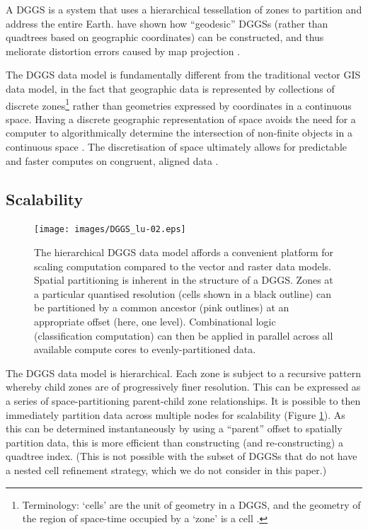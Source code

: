 \documentclass[]{interact}
\theoremstyle{plain}%
\theoremstyle{definition}
\theoremstyle{remark}
\begin{document}
A \ac{DGGS} is a system that uses a hierarchical tessellation of zones to partition and address the entire Earth. \citet{sahr2003geodesic} have shown how ``geodesic'' \acp{DGGS} (rather than quadtrees based on geographic coordinates) can be constructed, and thus meliorate distortion errors caused by map projection \citep{goodchild2018reimagining}.

The \ac{DGGS} data model is fundamentally different from the traditional vector \ac{GIS} data model, in the fact that geographic data is represented by collections of discrete zones\footnote{Terminology: `cells' are the unit of geometry in a \ac{DGGS}, and the geometry of the region of space-time occupied by a `zone' is a cell \citep{topic21}.} rather than geometries expressed by coordinates in a continuous space. Having a discrete geographic representation of space avoids the need for a computer to algorithmically determine the intersection of non-finite objects in a continuous space \citep{bentley1979algorithms,robertson2020integrated}. The discretisation of space ultimately allows for predictable and faster computes on congruent, aligned data \citep{dutton1989modelling}.

\subsection{Scalability}

\begin{figure}[t]
    \centering
    \texttt{[image: images/DGGS\_lu-02.eps]}
    \caption{The hierarchical \ac{DGGS} data model affords a convenient platform for scaling computation compared to the vector and raster data models. Spatial partitioning is inherent in the structure of a \ac{DGGS}. Zones at a particular quantised resolution (cells shown in a black outline) can be partitioned by a common ancestor (pink outlines) at an appropriate offset (here, one level). Combinational logic (classification computation) can then be applied in parallel across all available compute cores to evenly-partitioned data.}
    \label{fig:Scalable}
\end{figure}

The \ac{DGGS} data model is hierarchical. Each zone is subject to a recursive pattern whereby child zones are of progressively finer resolution. This can be expressed as a series of space-partitioning parent-child zone relationships. It is possible to then immediately partition data across multiple nodes for scalability (Figure \ref{fig:Scalable}). As this can be determined instantaneously by using a ``parent'' offset to spatially partition data, this is more efficient than constructing (and re-constructing) a quadtree index. (This is not possible with the subset of \acp{DGGS} that do not have a nested cell refinement strategy, which we do not consider in this paper.)
\end{document}
